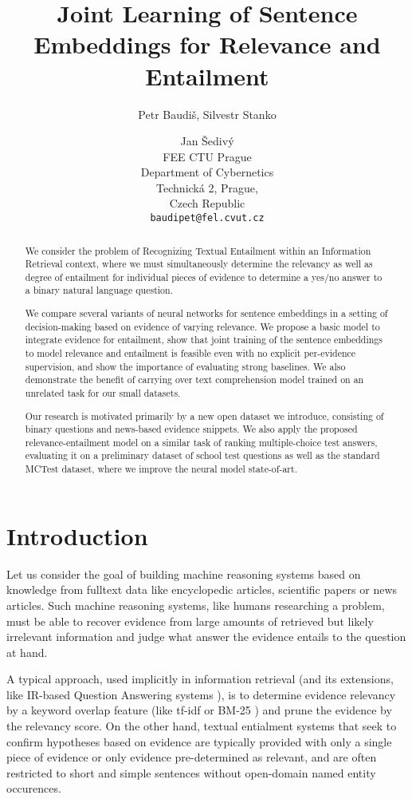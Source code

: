 \documentclass[11pt]{article}
\title{Joint Learning of Sentence Embeddings for Relevance and Entailment}
\author{Petr Baudi\v{s},
	Silvestr Stanko \and
	Jan \v{S}ediv\'{y} \\
	FEE CTU Prague\\
	Department of Cybernetics\\
	Technick\'{a} 2, Prague,\\Czech Republic\\
	{\tt baudipet@fel.cvut.cz}}
\date{}
\begin{document}
\maketitle

\begin{abstract}
	We consider the problem of Recognizing Textual Entailment
	within an Information Retrieval context, where we must simultaneously
	determine the relevancy as well as degree of entailment for individual
	pieces of evidence to determine a yes/no answer to a binary
	natural language question.

	We compare several variants of neural networks for sentence embeddings
	in a setting of decision-making based on evidence of varying relevance.
	We propose a basic model to integrate evidence for entailment,
	show that joint training of the sentence embeddings to model
	relevance and entailment is feasible even with no explicit per-evidence
	supervision, and show the importance of evaluating strong baselines.
	We also demonstrate the benefit of carrying over text comprehension model
	trained on an unrelated task for our small datasets.

	Our research is motivated primarily by a new open dataset we introduce,
	consisting of binary questions and news-based evidence snippets.
	We also apply the proposed relevance-entailment model on a similar task
	of ranking multiple-choice test answers, evaluating it on
	a preliminary dataset of school test questions as well as
	the standard MCTest dataset, where we improve the neural model state-of-art.
\end{abstract}

\section{Introduction}

Let us consider the goal of building machine reasoning systems based
on knowledge from fulltext data like encyclopedic articles, scientific
papers or news articles.
Such machine reasoning systems, like humans researching a problem,
must be able to recover evidence from large amounts of retrieved
but likely irrelevant information and judge what answer the evidence entails
to the question at hand.

A typical approach, used implicitly in information retrieval
(and its extensions, like IR-based Question Answering systems \cite{YodaQAPoster2015}),
is to determine evidence relevancy by a keyword overlap feature (like tf-idf or BM-25 \cite{BM25})
and prune the evidence by the relevancy score.
On the other hand, textual entialment systems that seek to confirm hypotheses
based on evidence \cite{RTE1} \cite{SICK2014} \cite{SNLI}
are typically provided with only a single piece of evidence
or only evidence pre-determined as relevant, and are often restricted
to short and simple sentences without open-domain named entity occurences.
\end{document}
